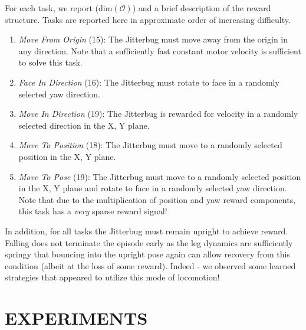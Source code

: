 \documentclass[letterpaper, 10 pt, conference]{ieeeconf}
\begin{document}
For each task, we report ($\text{dim}(\mathcal{O})$) and a brief description of the reward structure.
Tasks are reported here in approximate order of increasing difficulty.

\begin{enumerate}
    
    \item \emph{Move From Origin} (15): The Jitterbug must move away from the origin in any direction.
    Note that a sufficiently fast constant motor velocity is sufficient to solve this task.
    
    \item \emph{Face In Direction} (16): The Jitterbug must rotate to face in a randomly selected yaw direction.
    
    \item \emph{Move In Direction} (19): The Jitterbug is rewarded for velocity in a randomly selected direction in the X, Y plane.
    
    \item \emph{Move To Position} (18): The Jitterbug must move to a randomly selected position in the X, Y plane.
    
    \item \emph{Move To Pose} (19): The Jitterbug must move to a randomly selected position in the X, Y plane and rotate to face in a randomly selected yaw direction.
    Note that due to the multiplication of position and yaw reward components, this task has a \emph{very} sparse reward signal!
    
\end{enumerate}

In addition, for all tasks the Jitterbug must remain upright to achieve reward.
Falling does not terminate the episode early as the leg dynamics are sufficiently springy that bouncing into the upright pose again can allow recovery from this condition (albeit at the loss of some reward).
Indeed - we observed some learned strategies that appeared to utilize this mode of locomotion!

\section{EXPERIMENTS}
\end{document}
